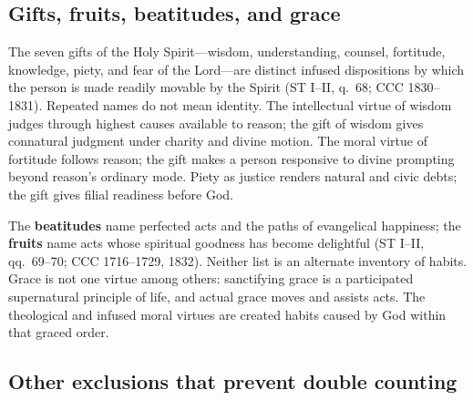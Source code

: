 \subsection{Gifts, fruits, beatitudes, and grace}

The seven gifts of the Holy Spirit---wisdom, understanding, counsel, fortitude, knowledge, piety, and fear of the Lord---are distinct infused dispositions by which the person is made readily movable by the Spirit (ST I--II, q.~68; CCC 1830--1831). Repeated names do not mean identity. The intellectual virtue of wisdom judges through highest causes available to reason; the gift of wisdom gives connatural judgment under charity and divine motion. The moral virtue of fortitude follows reason; the gift makes a person responsive to divine prompting beyond reason's ordinary mode. Piety as justice renders natural and civic debts; the gift gives filial readiness before God.

The \textbf{beatitudes} name perfected acts and the paths of evangelical happiness; the \textbf{fruits} name acts whose spiritual goodness has become delightful (ST I--II, qq.~69--70; CCC 1716--1729, 1832). Neither list is an alternate inventory of habits. Grace is not one virtue among others: sanctifying grace is a participated supernatural principle of life, and actual grace moves and assists acts. The theological and infused moral virtues are created habits caused by God within that graced order.

\subsection{Other exclusions that prevent double counting}

